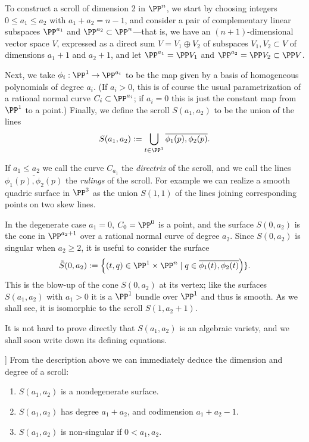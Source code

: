 To construct a scroll of dimension 2 in $\PP^n$, we start by choosing integers $0\leq a_1 \leq a_2$ with $a_1 + a_2 = n-1$, and consider  a pair of complementary linear subspaces $\PP^{a_1}$ and $\PP^{a_2} \subset \PP^n$---that is, we have an $(n+1)$-dimensional vector space $V$, expressed as a direct sum $V = V_1 \oplus V_2$ of subspaces $V_1, V_2 \subset V$ of dimensions $a_1+1$ and $a_2+1$, and let $\PP^{a_1} = \PP V_1$ and $\PP^{a_2} = \PP V_2 \subset \PP V$.

Next, we take $\phi_i : \PP^1 \to \PP^{a_i}$ to be the map given by a basis of homogeneous polynomials of degree $a_i$. (If $a_i > 0$, this is of course the usual parametrization of a rational normal curve $C_i \subset \PP^{a_i}$; if $a_i = 0$ this is just the constant map from $\PP^1$ to a point.) Finally, we define the scroll $S(a_1, a_2)$ to be the union of the lines
$$
S(a_1,a_2) := \bigcup_{t\in \PP^1} \overline{\phi_1(p), \phi_2(p)}.
$$

If $a_1\leq a_2$ we call the curve $C_{a_{1}}$ the \emph{directrix} of the scroll, and we call the lines $ \overline{\phi_1(p), \phi_2(p)}$ the \emph{rulings} of the scroll. For example we can realize a smooth quadric surface in $\PP^3$ as the union $S(1,1)$ of the lines joining corresponding points on two skew lines. 


In the degenerate case $a_{1}= 0$, $C_{0}= \PP^{0}$ is a point, and the surface $S(0,a_{2})$ is the cone
in $\PP^{a_{2}+1}$ over a rational normal curve of degree $a_{2}$. Since $S(0,a_2)$ is singular when $a_2\geq 2$, it is useful to consider the surface
$$
\tilde S(0, a_2) := \left\{ (t, q) \in \PP^1 \times \PP^n  \mid q \in \overline{\phi_1(t), \phi_2(t)}\right)\}.
$$
This is the blow-up of the cone $S(0, a_2)$ at its vertex; like the surfaces $S(a_1,a_2)$ with $a_1 > 0$ it is a $\PP^1$ bundle over $\PP^1$ and thus is smooth. As we shall see, it is isomorphic to the scroll $S(1, a_2+1)$.

It is not hard to prove directly that $S(a_1,a_2)$ is an algebraic variety, and we shall soon write down its defining equations.


]
From the description above we can immediately deduce the dimension and degree of a scroll:

\begin{proposition}
\begin{enumerate}
\item $S(a_1,a_2)$ is a nondegenerate surface.
 \item $S(a_1,a_2)$ has degree $a_1+a_2$, and codimension $a_1+a_2-1.$
 \item $S(a_{1},a_{2})$ is non-singular if $0<a_{1}, a_{2}$.
 \end{enumerate}
\end{proposition}\label{deg and codim}

